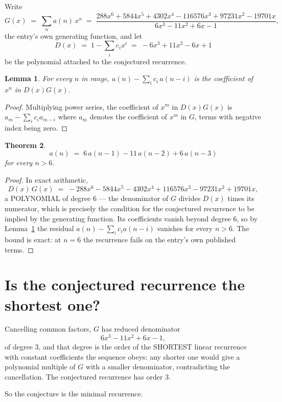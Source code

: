\documentclass[11pt,a4paper]{article}
\theoremstyle{plain}
\newtheorem{theorem}{Theorem}
\newtheorem{lemma}[theorem]{Lemma}
\theoremstyle{definition}
\begin{document}
Write
\[
G(x)\;=\;\sum_{n}a(n)\,x^{n}\;=\;\frac{288 x^{6} + 5844 x^{5} + 4302 x^{4} - 116576 x^{3} + 97231 x^{2} - 19701 x}{6 x^{3} - 11 x^{2} + 6 x - 1},
\]
the entry's own generating function, and let
\[
D(x)\;=\;1-\sum_i c_i x^{i}\;=\;- 6 x^{3} + 11 x^{2} - 6 x + 1
\]
be the polynomial attached to the conjectured recurrence.

\begin{lemma}\label{lem:key}
For every $n$ in range, $a(n)-\sum_i c_i\,a(n-i)$ is the coefficient of $x^{n}$ in
$D(x)G(x)$.
\end{lemma}

\begin{proof}
Multiplying power series, the coefficient of $x^{m}$ in $D(x)G(x)$ is
$a_m-\sum_i c_i a_{m-i}$ where $a_m$ denotes the coefficient of $x^{m}$ in $G$, terms with
negative index being zero.
\end{proof}

\begin{theorem}
\[
a(n)\;=\;6\,a(n-1) - 11\,a(n-2) + 6\,a(n-3)
\]
for every $n>6$.
\end{theorem}

\begin{proof}
In exact arithmetic,
\[
D(x)\,G(x)\;=\;- 288 x^{6} - 5844 x^{5} - 4302 x^{4} + 116576 x^{3} - 97231 x^{2} + 19701 x,
\]
a POLYNOMIAL of degree $6$ --- the denominator of $G$ divides $D(x)$ times its numerator,
which is precisely the condition for the conjectured recurrence to be implied by the
generating function. Its coefficients vanish beyond degree $6$, so by
Lemma~\ref{lem:key} the residual $a(n)-\sum_ic_ia(n-i)$ vanishes for every
$n>6$. The bound is exact: at $n=6$ the recurrence fails on the entry's own published terms.
\end{proof}

\section{Is the conjectured recurrence the shortest one?}

Cancelling common factors, $G$ has reduced denominator
\[
6 x^{3} - 11 x^{2} + 6 x - 1,
\]
of degree $3$, and that degree is the order of the SHORTEST linear recurrence with
constant coefficients the sequence obeys: any shorter one would give a polynomial multiple of
$G$ with a smaller denominator, contradicting the cancellation. The conjectured recurrence has
order $3$.

So the conjecture is the minimal recurrence.
\end{document}
